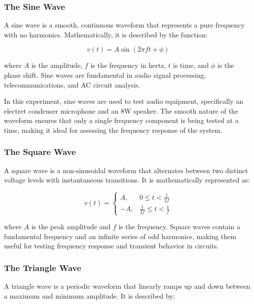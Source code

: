 \documentclass[12pt]{article}
\begin{document}
\subsubsection{The Sine Wave}
A sine wave is a smooth, continuous waveform that represents a pure frequency
with no harmonics. Mathematically, it is described by the function:

\begin{equation} v(t) = A \sin(2\pi f t + \phi) \end{equation}

where \( A \) is the amplitude, \( f \) is the frequency in hertz, \( t \) is
time, and \( \phi \) is the phase shift. Sine waves are fundamental in audio
signal processing, telecommunications, and AC circuit analysis.

In this experiment, sine waves are used to test audio equipment, specifically an
electret condenser microphone and an 8W speaker. The smooth nature of the
waveform ensures that only a single frequency component is being tested at a
time, making it ideal for assessing the frequency response of the system.

\subsubsection{The Square Wave} A square wave is a non-sinusoidal waveform that
alternates between two distinct voltage levels with instantaneous transitions.
It is mathematically represented as:

\begin{equation} v(t) = \begin{cases} A,  & 0 \leq t < \frac{1}{2f}           \\
              -A, & \frac{1}{2f} \leq t < \frac{1}{f}\end{cases} \end{equation}

where \( A \) is the peak amplitude and \( f \) is the frequency. Square waves
contain a fundamental frequency and an infinite series of odd harmonics, making
them useful for testing frequency response and transient behavior in circuits.

\subsubsection{The Triangle Wave} A triangle wave is a periodic waveform that
linearly ramps up and down between a maximum and minimum amplitude. It is
described by:
\end{document}
